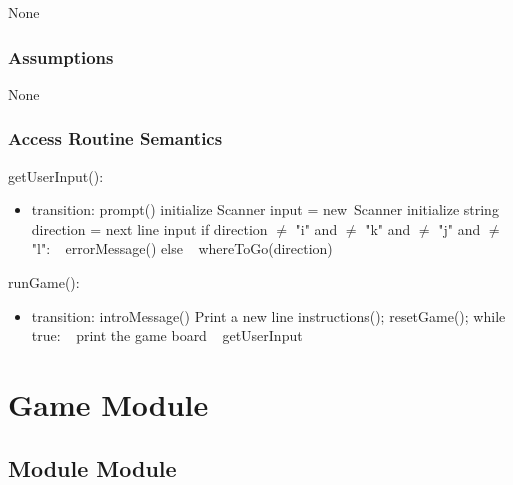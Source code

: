 \documentclass[12pt]{article}
\begin{document}
None

\subsubsection* {Assumptions}

None

\subsubsection* {Access Routine Semantics}

\noindent getUserInput():
\begin{itemize}
\item transition: \newline
      \mbox{prompt()} \newline
      initialize Scanner input = \mbox{new Scanner} \newline
      initialize string direction = next line input \newline
      if direction $\neq$ "i" and $\neq$ "k" and $\neq$ "j" and $\neq$ "l": \newline
      $~~$ \mbox{errorMessage()}\newline
      else \newline
      $~~$ \mbox{whereToGo(direction)} \newline
\end{itemize} 

\noindent runGame():
\begin{itemize}
\item transition: \newline
      \mbox{introMessage()} \newline
      Print a new line \newline
      \mbox{instructions()}; \newline
      \mbox{resetGame()}; \newline
      while true: \newline
      $~~$ print the game board \newline
      $~~$ \mbox{getUserInput} \newline
\end{itemize} 

\newpage

\section* {Game Module}

\subsection*{Module Module}
\end{document}
